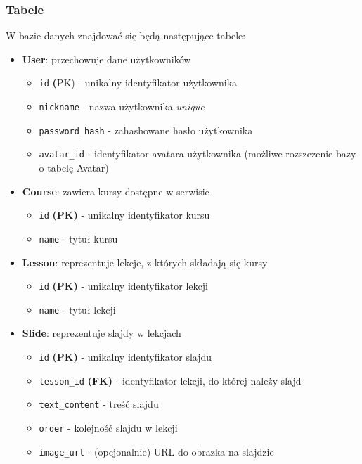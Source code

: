\documentclass[11pt,a4paper]{article}
\numberwithin{equation}{section}
\begin{document}
\subsubsection{Tabele}
W bazie danych znajdować się będą następujące tabele:
\begin{itemize}
    \item \textbf{User}: przechowuje dane użytkowników
        \begin{itemize}
            \item \texttt{id} \textbf(PK) - unikalny identyfikator użytkownika
            \item \texttt{nickname} - nazwa użytkownika \textit{unique}
            \item \texttt{password\_hash} - zahashowane hasło użytkownika
            \item \texttt{avatar\_id} - identyfikator avatara użytkownika (możliwe rozszezenie bazy o tabelę Avatar)
        \end{itemize}
    \item \textbf{Course}: zawiera kursy dostępne w serwisie
        \begin{itemize}
            \item \texttt{id} \textbf{(PK)} - unikalny identyfikator kursu
            \item \texttt{name} - tytuł kursu
        \end{itemize}
    \item \textbf{Lesson}: reprezentuje lekcje, z których składają się kursy
        \begin{itemize}
            \item \texttt{id} \textbf{(PK)} - unikalny identyfikator lekcji
            \item \texttt{name} - tytuł lekcji
        \end{itemize}
    \item \textbf{Slide}: reprezentuje slajdy w lekcjach
        \begin{itemize}
            \item \texttt{id} \textbf{(PK)} - unikalny identyfikator slajdu
            \item \texttt{lesson\_id} \textbf{(FK)} - identyfikator lekcji, do której należy slajd
            \item \texttt{text\_content} - treść slajdu 
            \item \texttt{order} - kolejność slajdu w lekcji
            \item \texttt{image\_url} - (opcjonalnie) URL do obrazka na slajdzie

\end{itemize}
\end{itemize}
\end{document}
